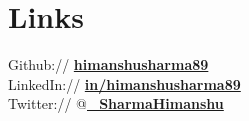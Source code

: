 \documentclass[]{deedy-resume-reversed}
\begin{document}
\begin{minipage}[t]{0.35\textwidth}

\section{Links}
Github:// \href{https://github.com/himanshusharma89}{\bf himanshusharma89} \\
LinkedIn://  \href{https://www.linkedin.com/in/himanshusharma89}{\bf in/himanshusharma89} \\
Twitter:// @\href{https://twitter.com/_SharmaHimanshu}{\bf \_SharmaHimanshu}
\sectionsep

\end{minipage}
\end{document}
